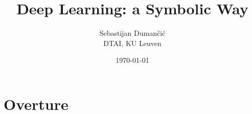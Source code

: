 \documentclass[aspectratio=169]{beamer}
\title{Deep Learning: a Symbolic Way}
\author{Sebastijan Dumančić \\ DTAI, KU Leuven}
\date{\today}
\begin{document}
\maketitle



%
%

\section{Overture}

\begin{frame}{}

\end{frame}
\end{document}
